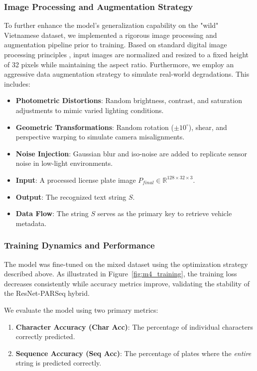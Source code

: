 \documentclass[a4paper,11pt,twocolumn]{article}
\begin{document}
	\subsubsection{Image Processing and Augmentation Strategy}
	
	To further enhance the model's generalization capability on the "wild" Vietnamese dataset, we implemented a rigorous image processing and augmentation pipeline prior to training.
	Based on standard digital image processing principles \cite{Gonzalez2018DigitalIP}, input images are normalized and resized to a fixed height of 32 pixels while maintaining the aspect ratio.
	Furthermore, we employ an aggressive data augmentation strategy \cite{Shorten2019ASO} to simulate real-world degradations. This includes:
	\begin{itemize}
		\item \textbf{Photometric Distortions}: Random brightness, contrast, and saturation adjustments to mimic varied lighting conditions.
		\item \textbf{Geometric Transformations}: Random rotation ($\pm 10^\circ$), shear, and perspective warping to simulate camera misalignments.
		\item \textbf{Noise Injection}: Gaussian blur and iso-noise are added to replicate sensor noise in low-light environments.
	\end{itemize}
	
	\begin{itemize}
		\item \textbf{Input}: A processed license plate image $P_{final} \in \mathbb{R}^{128 \times 32 \times 3}$.
		\item \textbf{Output}: The recognized text string $S$.
		\item \textbf{Data Flow}: The string $S$ serves as the primary key to retrieve vehicle metadata.
	\end{itemize}
	
	\subsubsection{Training Dynamics and Performance}
	
	The model was fine-tuned on the mixed dataset using the optimization strategy described above. As illustrated in Figure~\ref{fig:m4_training}, the training loss decreases consistently while accuracy metrics improve, validating the stability of the ResNet-PARSeq hybrid.
	
	We evaluate the model using two primary metrics:
	\begin{enumerate}
		\item \textbf{Character Accuracy (Char Acc)}: The percentage of individual characters correctly predicted.
		\item \textbf{Sequence Accuracy (Seq Acc)}: The percentage of plates where the \textit{entire} string is predicted correctly.
	\end{enumerate}
	
\end{document}
